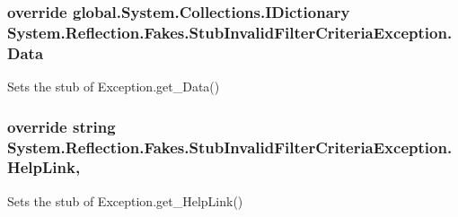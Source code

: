 \hypertarget{class_system_1_1_reflection_1_1_fakes_1_1_stub_invalid_filter_criteria_exception_a151b0be43a80fdf016f512d312c42112}{
\subsubsection[{Data}]{\setlength{\rightskip}{0pt plus 5cm}override global.\-System.\-Collections.\-I\-Dictionary System.\-Reflection.\-Fakes.\-Stub\-Invalid\-Filter\-Criteria\-Exception.\-Data\hspace{0.3cm}{\ttfamily [get]}}}\label{class_system_1_1_reflection_1_1_fakes_1_1_stub_invalid_filter_criteria_exception_a151b0be43a80fdf016f512d312c42112}


Sets the stub of Exception.\-get\-\_\-\-Data()

\hypertarget{class_system_1_1_reflection_1_1_fakes_1_1_stub_invalid_filter_criteria_exception_af98af176e9275d2337478b774f6822b3}{
\subsubsection[{Help\-Link}]{\setlength{\rightskip}{0pt plus 5cm}override string System.\-Reflection.\-Fakes.\-Stub\-Invalid\-Filter\-Criteria\-Exception.\-Help\-Link\hspace{0.3cm}{\ttfamily [get]}, {\ttfamily [set]}}}\label{class_system_1_1_reflection_1_1_fakes_1_1_stub_invalid_filter_criteria_exception_af98af176e9275d2337478b774f6822b3}


Sets the stub of Exception.\-get\-\_\-\-Help\-Link()

